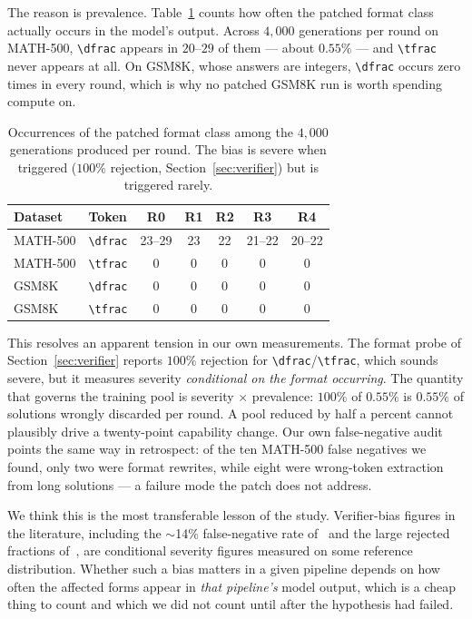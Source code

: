 \documentclass[runningheads]{llncs}
\begin{document}
The reason is prevalence. Table~\ref{tab:prevalence} counts how often the
patched format class actually occurs in the model's output. Across $4{,}000$
generations per round on MATH-500, \verb|\dfrac| appears in $20$--$29$ of
them --- about $0.55\%$ --- and \verb|\tfrac| never appears at all. On
GSM8K, whose answers are integers, \verb|\dfrac| occurs zero times in every
round, which is why no patched GSM8K run is worth spending compute on.

\begin{table}[t]
\caption{Occurrences of the patched format class among the $4{,}000$
generations produced per round. The bias is severe when triggered
($100\%$ rejection, Section~\ref{sec:verifier}) but is triggered rarely.}
\label{tab:prevalence}
\centering
\begin{tabular}{llccccc}
\toprule
Dataset & Token & R0 & R1 & R2 & R3 & R4 \\
\midrule
MATH-500 & \verb|\dfrac| & 23--29 & 23 & 22 & 21--22 & 20--22 \\
MATH-500 & \verb|\tfrac| & 0 & 0 & 0 & 0 & 0 \\
GSM8K & \verb|\dfrac| & 0 & 0 & 0 & 0 & 0 \\
GSM8K & \verb|\tfrac| & 0 & 0 & 0 & 0 & 0 \\
\bottomrule
\end{tabular}
\end{table}

This resolves an apparent tension in our own measurements. The format probe
of Section~\ref{sec:verifier} reports $100\%$ rejection for
\verb|\dfrac|/\verb|\tfrac|, which sounds severe, but it measures severity
\emph{conditional on the format occurring}. The quantity that governs the
training pool is severity $\times$ prevalence: $100\%$ of $0.55\%$ is
$0.55\%$ of solutions wrongly discarded per round. A pool reduced by half a
percent cannot plausibly drive a twenty-point capability change. Our own
false-negative audit points the same way in retrospect: of the ten
MATH-500 false negatives we found, only two were format rewrites, while
eight were wrong-token extraction from long solutions --- a failure mode the
patch does not address.

We think this is the most transferable lesson of the study. Verifier-bias
figures in the literature, including the $\sim$14\% false-negative rate
of~\cite{ref_robustness} and the large rejected fractions
of~\cite{ref_tinyv}, are conditional severity figures measured on some
reference distribution. Whether such a bias matters in a given pipeline
depends on how often the affected forms appear in \emph{that pipeline's}
model output, which is a cheap thing to count and which we did not count
until after the hypothesis had failed.
\end{document}
